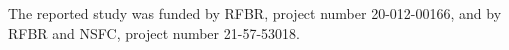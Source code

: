 
\vspace*{-14pt}

\Ack

\vspace*{-2pt}

\noindent
The reported study was funded by RFBR, project number 20-012-00166, and
 by RFBR and NSFC, project number 21-57-53018.

\vspace*{5pt}

  \begin{multicols}{2}

\renewcommand{\bibname}{\protect\rmfamily References}

{\small\frenchspacing
 {%
 \begin{thebibliography}{99}
 
 \vspace*{-3pt}
 

\end{thebibliography}}}
\end{multicols}
